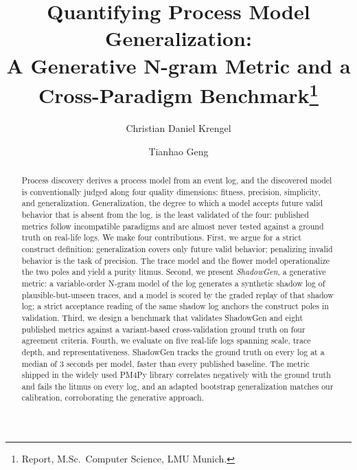 \documentclass[runningheads]{llncs}
\begin{document}
\title{Quantifying Process Model Generalization:\\
A Generative N-gram Metric and a Cross-Paradigm Benchmark\thanks{Report, M.Sc.\ Computer Science, LMU Munich.}}

\author{Christian Daniel Krengel \and Tianhao Geng}

\maketitle

\begin{abstract}
Process discovery derives a process model from an event log, and the discovered model is conventionally judged along four quality dimensions: fitness, precision, simplicity, and generalization. Generalization, the degree to which a model accepts future valid behavior that is absent from the log, is the least validated of the four: published metrics follow incompatible paradigms and are almost never tested against a ground truth on real-life logs. We make four contributions. First, we argue for a strict construct definition: generalization covers only future valid behavior; penalizing invalid behavior is the task of precision. The trace model and the flower model operationalize the two poles and yield a purity litmus. Second, we present \emph{ShadowGen}, a generative metric: a variable-order N-gram model of the log generates a synthetic shadow log of plausible-but-unseen traces, and a model is scored by the graded replay of that shadow log; a strict acceptance reading of the same shadow log anchors the construct poles in validation. Third, we design a benchmark that validates ShadowGen and eight published metrics against a variant-based cross-validation ground truth on four agreement criteria. Fourth, we evaluate on five real-life logs spanning scale, trace depth, and representativeness. ShadowGen tracks the ground truth on every log at a median of $3$ seconds per model, faster than every published baseline. The metric shipped in the widely used PM4Py library correlates negatively with the ground truth and fails the litmus on every log, and an adapted bootstrap generalization matches our calibration, corroborating the generative approach.

\end{abstract}
\end{document}
